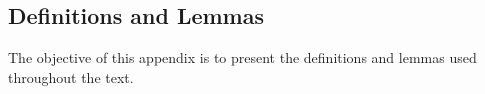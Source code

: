 \documentclass[../thesis.tex]{subfiles}
\begin{document}
\newpage

\subsection{Definitions and Lemmas}

The objective of this appendix is to present the definitions and lemmas used throughout the text.

\begin{comment}

\subsubsection*{Household}

	
	\begin{definition}[Household Maximization Problem]
		{\singlespacing
			The utility function is:
			\begin{itemize}
				\item strictly increasing in consumption $C$;
				\item strictly increasing in leisure $l$;
				\item strictly concave;
				\item twice continuously differentiable;
				\item the composite consumption good $C$ is also the numeraire good, so that its price equals one: $p_C=1$;
				\item to avoid corner solutions, the Inada conditions\footnotemark{} hold. \footnotetext{see definition \ref{def:Inada Condition}.}
		\end{itemize}}
		
		Consider a representative household that maximizes an utility function $u$ that depends on consumption $C_t$ and labor $L_t$:
		\begin{align}
			u \equiv u \left( C_t, L_t \right)
		\end{align}
		
		The utility function is considered to be convex (when a variable increases, the respective marginal utility diminishes)\footnotemark{}: \footnotetext{Consider the following notation: given two variables $X$ and $Y$, the first and second partial derivatives are: $Y_X := \displaystyle\frac{\partial Y}{\partial X}$ and $Y_{XX} := \displaystyle\frac{\partial^2 Y}{\partial X^2}$.}
		\begin{align*}
			u_{C} > 0 \text{,}\quad u_{CC} < 0 \text{,}\quad
			u_{L} > 0 \text{,}\quad u_{LL} < 0
		\end{align*}
		

\end{comment}
\end{document}
